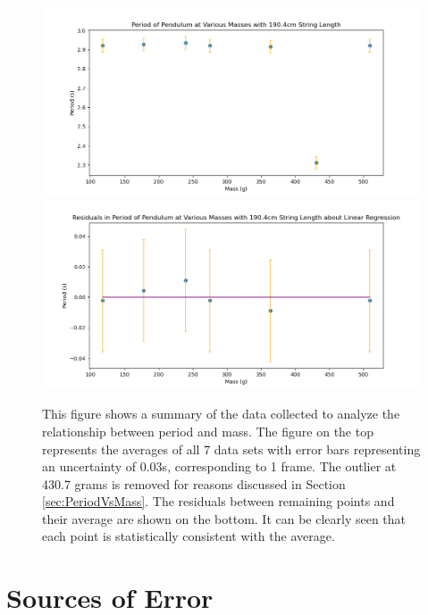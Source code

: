 \documentclass[11pt]{article}
\begin{document}
        \begin{figure}[H]
            \includegraphics[width = \textwidth]{PeriodVsMass.png}
            \includegraphics[width = \textwidth]{ResidualsPeriodVsMass.png}
            \caption{This figure shows a summary of the data collected to analyze the relationship between period and mass. The figure on the top represents the averages of all 7 data sets with error bars representing an uncertainty of 0.03s, corresponding to 1 frame. The outlier at 430.7 grams is removed for reasons discussed in Section \ref{sec:PeriodVsMass}. The residuals between remaining points and their average are shown on the bottom. It can be clearly seen that each point is statistically consistent with the average.}
            \label{fig:AnalyzedMassVsPeriod}
        \end{figure}

    \section{Sources of Error}        
\end{document}
